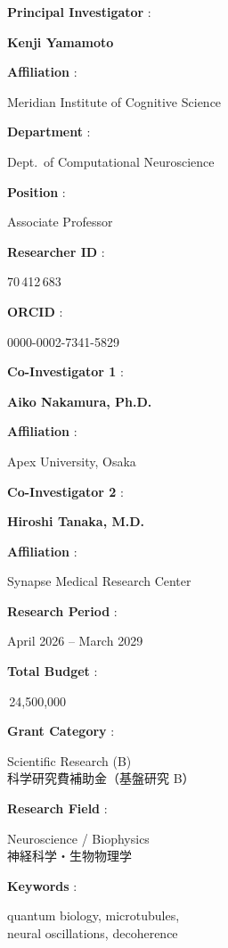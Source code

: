 \documentclass[11pt,a4paper]{article}
\newcommand{\bilabel}[2]{%
  \textbf{\textcolor{jspsNavy}{#1}}\enspace{\footnotesize\textcolor{jspsSlate}{(#2)}}%
}
\newcommand{\fieldrow}[2]{%
  \noindent\begin{minipage}[t]{0.38\linewidth}%
    \raggedright\small\textcolor{jspsSlate}{#1}%
  \end{minipage}%
  \begin{minipage}[t]{0.60\linewidth}%
    \raggedright\small #2%
  \end{minipage}\par\vspace{2pt}%
}
\begin{document}
\begin{CJK}{UTF8}{min}
\begin{tcolorbox}[jspsSection,
  title={\faUser\enspace \bilabel{Applicant Information}{申請者情報} \hfill \small Section 1}]
  \noindent\begin{minipage}[t]{0.48\linewidth}
    \begin{tcolorbox}[jspsInfo]
      \fieldrow{\bilabel{Principal Investigator}{研究代表者}:}{\textbf{Kenji Yamamoto}}
      \fieldrow{\bilabel{Affiliation}{所属機関}:}{Meridian Institute of Cognitive Science}
      \fieldrow{\bilabel{Department}{部署}:}{Dept.\ of Computational Neuroscience}
      \fieldrow{\bilabel{Position}{職位}:}{Associate Professor}
      \fieldrow{\bilabel{Researcher ID}{研究者番号}:}{70\,412\,683}
      \fieldrow{\bilabel{ORCID}{ORCID}:}{0000-0002-7341-5829}
    \end{tcolorbox}
  \end{minipage}%
  \hfill
  \begin{minipage}[t]{0.48\linewidth}
    \begin{tcolorbox}[jspsInfo]
      \fieldrow{\bilabel{Co-Investigator 1}{研究分担者 1}:}{\textbf{Aiko Nakamura, Ph.D.}}
      \fieldrow{\bilabel{Affiliation}{所属}:}{Apex University, Osaka}
      \fieldrow{\bilabel{Co-Investigator 2}{研究分担者 2}:}{\textbf{Hiroshi Tanaka, M.D.}}
      \fieldrow{\bilabel{Affiliation}{所属}:}{Synapse Medical Research Center}
      \fieldrow{\bilabel{Research Period}{研究期間}:}{April 2026 -- March 2029}
      \fieldrow{\bilabel{Total Budget}{総予算額}:}{\textyen\,24,500,000}
    \end{tcolorbox}
  \end{minipage}

  \vspace{4pt}
  \noindent\begin{minipage}[t]{0.32\linewidth}
    \begin{tcolorbox}[jspsInfo]
      \fieldrow{\bilabel{Grant Category}{研究種目}:}{Scientific Research (B)\\
        {\footnotesize\textcolor{jspsSlate}{科学研究費補助金（基盤研究 B）}}}
    \end{tcolorbox}
  \end{minipage}%
  \hfill
  \begin{minipage}[t]{0.32\linewidth}
    \begin{tcolorbox}[jspsInfo]
      \fieldrow{\bilabel{Research Field}{研究分野}:}{Neuroscience / Biophysics\\
        {\footnotesize\textcolor{jspsSlate}{神経科学・生物物理学}}}
    \end{tcolorbox}
  \end{minipage}%
  \hfill
  \begin{minipage}[t]{0.30\linewidth}
    \begin{tcolorbox}[jspsInfo]
      \fieldrow{\bilabel{Keywords}{キーワード}:}{quantum biology, microtubules,\\neural oscillations, decoherence}
    \end{tcolorbox}
  \end{minipage}


\end{tcolorbox}
\end{CJK}
\end{document}
